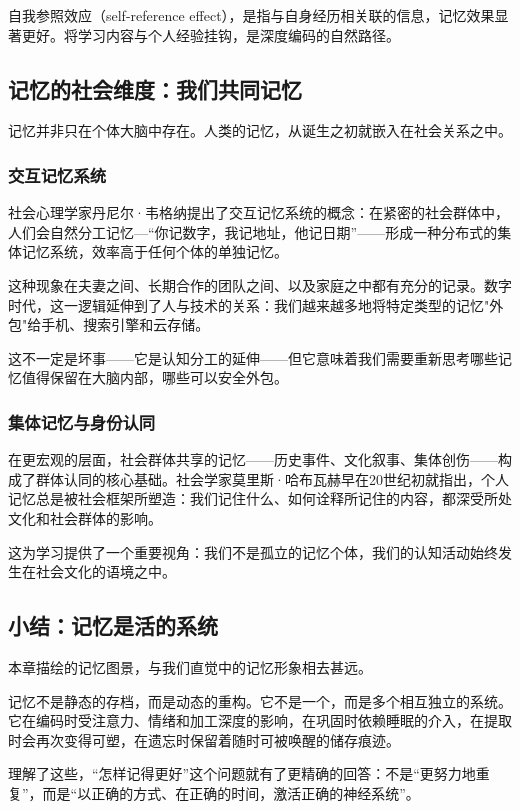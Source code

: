 \documentclass[11pt]{article}
\begin{document}
自我参照效应（self-reference effect），是指与自身经历相关联的信息，记忆效果显著更好。将学习内容与个人经验挂钩，是深度编码的自然路径。
\subsection{记忆的社会维度：我们共同记忆}
\label{sec:org4793b92}

记忆并非只在个体大脑中存在。人类的记忆，从诞生之初就嵌入在社会关系之中。
\subsubsection{交互记忆系统}
\label{sec:orgb5aaf35}

社会心理学家丹尼尔·韦格纳提出了交互记忆系统的概念：在紧密的社会群体中，人们会自然分工记忆—“你记数字，我记地址，他记日期”——形成一种分布式的集体记忆系统，效率高于任何个体的单独记忆。

这种现象在夫妻之间、长期合作的团队之间、以及家庭之中都有充分的记录。数字时代，这一逻辑延伸到了人与技术的关系：我们越来越多地将特定类型的记忆"外包"给手机、搜索引擎和云存储。

这不一定是坏事——它是认知分工的延伸——但它意味着我们需要重新思考哪些记忆值得保留在大脑内部，哪些可以安全外包。
\subsubsection{集体记忆与身份认同}
\label{sec:org7a84690}

在更宏观的层面，社会群体共享的记忆——历史事件、文化叙事、集体创伤——构成了群体认同的核心基础。社会学家莫里斯·哈布瓦赫早在20世纪初就指出，个人记忆总是被社会框架所塑造：我们记住什么、如何诠释所记住的内容，都深受所处文化和社会群体的影响。

这为学习提供了一个重要视角：我们不是孤立的记忆个体，我们的认知活动始终发生在社会文化的语境之中。
\subsection{小结：记忆是活的系统}
\label{sec:org7bea765}

本章描绘的记忆图景，与我们直觉中的记忆形象相去甚远。

记忆不是静态的存档，而是动态的重构。它不是一个，而是多个相互独立的系统。它在编码时受注意力、情绪和加工深度的影响，在巩固时依赖睡眠的介入，在提取时会再次变得可塑，在遗忘时保留着随时可被唤醒的储存痕迹。

理解了这些，“怎样记得更好”这个问题就有了更精确的回答：不是“更努力地重复”，而是“以正确的方式、在正确的时间，激活正确的神经系统”。
\end{document}
